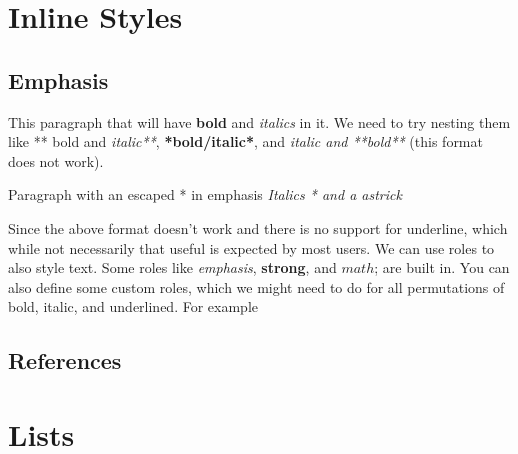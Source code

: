 \documentclass{book}
\begin{document}
\section{Inline Styles%
  \label{inline-styles}%
}


\subsection{Emphasis%
  \label{emphasis}%
}

This paragraph that will have \textbf{bold} and \emph{italics} in it. We need to try nesting them like ** bold and \emph{italic**}, \textbf{*bold/italic*}, and \emph{italic and **bold**} (this format does not work).

Paragraph with an escaped * in emphasis \emph{Italics * and a astrick}

Since the above format doesn't work and there is no support for underline, which while not necessarily that useful is expected by most users. We can use roles to also style text. Some roles like \emph{emphasis}, \textbf{strong}, and $math$; are built in. You can also define some custom roles, which we might need to do for all permutations of bold, italic, and underlined. For example %

\subsection{References%
  \label{references}%
}

\section{Lists%
  \label{lists}%
}
\end{document}
